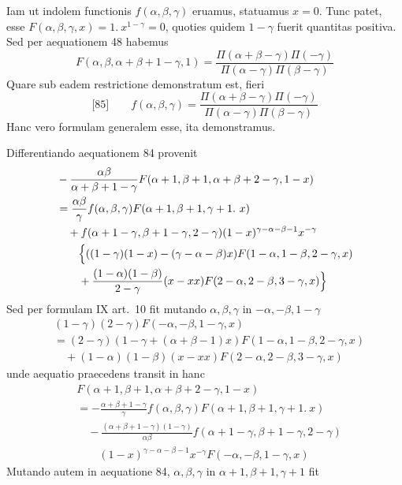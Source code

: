 Iam ut indolem functionis \(f(\alpha,\beta,\gamma)\) eruamus, statuamus \(x=0\). Tunc patet, esse \(F(\alpha,\beta,\gamma,x)=1.\ x^{1-\gamma}=0\), quoties quidem \(1-\gamma\) fuerit quantitas positiva. Sed per aequationem 48 habemus
\[
F(\alpha,\beta,\alpha+\beta+1-\gamma,1)=\frac{\Pi(\alpha+\beta-\gamma)\Pi(-\gamma)}{\Pi(\alpha-\gamma)\Pi(\beta-\gamma)}
\]
Quare sub eadem restrictione demonstratum est, fieri
\[
\text{[85]}\qquad f(\alpha,\beta,\gamma)=\frac{\Pi(\alpha+\beta-\gamma)\Pi(-\gamma)}{\Pi(\alpha-\gamma)\Pi(\beta-\gamma)}
\]
Hanc vero formulam generalem esse, ita demonstramus.
\par{}
Differentiando aequationem 84 provenit
\[
\begin{aligned}
&-\frac{\alpha\beta}{\alpha+\beta+1-\gamma}F(\alpha+1,\beta+1,\alpha+\beta+2-\gamma,1-x)\\
&=\frac{\alpha\beta}{\gamma}f(\alpha,\beta,\gamma)F(\alpha+1,\beta+1,\gamma+1.\ x)\\
&\quad+f(\alpha+1-\gamma,\beta+1-\gamma,2-\gamma)(1-x)^{\gamma-\alpha-\beta-1}x^{-\gamma}\\&\qquad\Bigl\{((1-\gamma)(1-x)-(\gamma-\alpha-\beta)x)F(1-\alpha,1-\beta,2-\gamma,x)\\
&\qquad+\frac{(1-\alpha)(1-\beta)}{2-\gamma}(x-xx)F(2-\alpha,2-\beta,3-\gamma,x)\Bigr\}
\end{aligned}
\]
Sed per formulam IX art.\ 10 fit mutando \(\alpha,\beta,\gamma\) in \(-\alpha,-\beta,1-\gamma\)
\[
\begin{aligned}
&(1-\gamma)(2-\gamma)F(-\alpha,-\beta,1-\gamma,x)\\&=(2-\gamma)(1-\gamma+(\alpha+\beta-1)x)F(1-\alpha,1-\beta,2-\gamma,x)\\
&\quad+(1-\alpha)(1-\beta)(x-xx)F(2-\alpha,2-\beta,3-\gamma,x)
\end{aligned}
\]
unde aequatio praecedens transit in hanc
\[
\begin{aligned}
&F(\alpha+1,\beta+1,\alpha+\beta+2-\gamma,1-x)\\
&=-\frac{\alpha+\beta+1-\gamma}{\gamma}f(\alpha,\beta,\gamma)F(\alpha+1,\beta+1,\gamma+1.\ x)\\
&\quad-\frac{(\alpha+\beta+1-\gamma)(1-\gamma)}{\alpha\beta}f(\alpha+1-\gamma,\beta+1-\gamma,2-\gamma)\\&\qquad(1-x)^{\gamma-\alpha-\beta-1}x^{-\gamma}F(-\alpha,-\beta,1-\gamma,x)
\end{aligned}
\]
Mutando autem in aequatione 84, \(\alpha,\beta,\gamma\) in \(\alpha+1,\beta+1,\gamma+1\) fit
